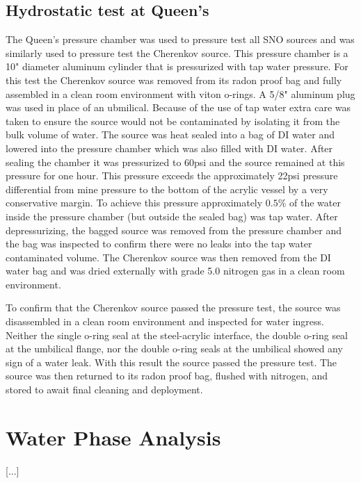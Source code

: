 \subsection{Hydrostatic test at Queen's}

\begin{figure}
\centering
\caption{}
\label{fig:pressurechamber}
\end{figure}

The Queen's pressure chamber was used to pressure test all SNO sources and was similarly used to pressure test the Cherenkov source. This pressure chamber is a 10" diameter aluminum cylinder that is pressurized with tap water pressure. For this test the Cherenkov source was removed from its radon proof bag and fully assembled in a clean room environment with viton o-rings. A 5/8" aluminum plug was used in place of an ubmilical. Because of the use of tap water extra care was taken to ensure the source would not be contaminated by isolating it from the bulk volume of water. The source was heat sealed into a bag of DI water and lowered into the pressure chamber which was also filled with DI water. After sealing the chamber it was pressurized to 60psi and the source remained at this pressure for one hour. This pressure exceeds the approximately 22psi pressure differential from mine pressure to the bottom of the acrylic vessel by a very conservative margin. To achieve this pressure approximately $0.5\%$ of the water inside the pressure chamber (but outside the sealed bag) was tap water. After depressurizing, the bagged source was removed from the pressure chamber and the bag was inspected to confirm there were no leaks into the tap water contaminated volume. The Cherenkov source was then removed from the DI water bag and was dried externally with grade 5.0 nitrogen gas in a clean room environment. 

To confirm that the Cherenkov source passed the pressure test, the source was disassembled in a clean room environment and inspected for water ingress. Neither the single o-ring seal at the steel-acrylic interface, the double o-ring seal at the umbilical flange, nor the double o-ring seals at the umbilical showed any sign of a water leak. With this result the source passed the pressure test. The source was then returned to its radon proof bag, flushed with nitrogen, and stored to await final cleaning and deployment.

\section{Water Phase Analysis}
\label{chap:water_phase}
[...]
